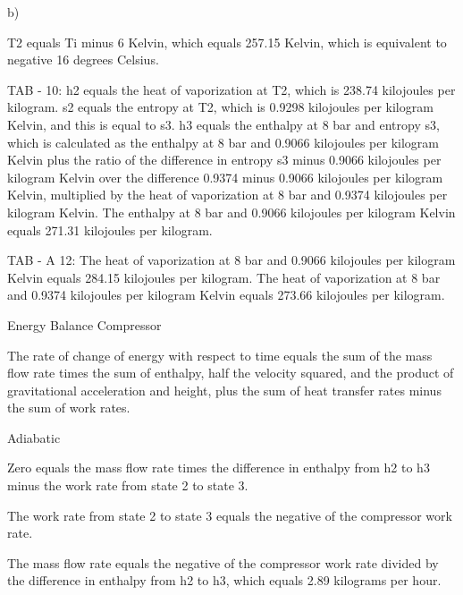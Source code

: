 b)

T2 equals Ti minus 6 Kelvin, which equals 257.15 Kelvin, which is equivalent to negative 16 degrees Celsius.

TAB - 10:
h2 equals the heat of vaporization at T2, which is 238.74 kilojoules per kilogram.
s2 equals the entropy at T2, which is 0.9298 kilojoules per kilogram Kelvin, and this is equal to s3.
h3 equals the enthalpy at 8 bar and entropy s3, which is calculated as the enthalpy at 8 bar and 0.9066 kilojoules per kilogram Kelvin plus the ratio of the difference in entropy s3 minus 0.9066 kilojoules per kilogram Kelvin over the difference 0.9374 minus 0.9066 kilojoules per kilogram Kelvin, multiplied by the heat of vaporization at 8 bar and 0.9374 kilojoules per kilogram Kelvin.
The enthalpy at 8 bar and 0.9066 kilojoules per kilogram Kelvin equals 271.31 kilojoules per kilogram.

TAB - A 12:
The heat of vaporization at 8 bar and 0.9066 kilojoules per kilogram Kelvin equals 284.15 kilojoules per kilogram.
The heat of vaporization at 8 bar and 0.9374 kilojoules per kilogram Kelvin equals 273.66 kilojoules per kilogram.

Energy Balance Compressor

The rate of change of energy with respect to time equals the sum of the mass flow rate times the sum of enthalpy, half the velocity squared, and the product of gravitational acceleration and height, plus the sum of heat transfer rates minus the sum of work rates.

Adiabatic

Zero equals the mass flow rate times the difference in enthalpy from h2 to h3 minus the work rate from state 2 to state 3.

The work rate from state 2 to state 3 equals the negative of the compressor work rate.

The mass flow rate equals the negative of the compressor work rate divided by the difference in enthalpy from h2 to h3, which equals 2.89 kilograms per hour.